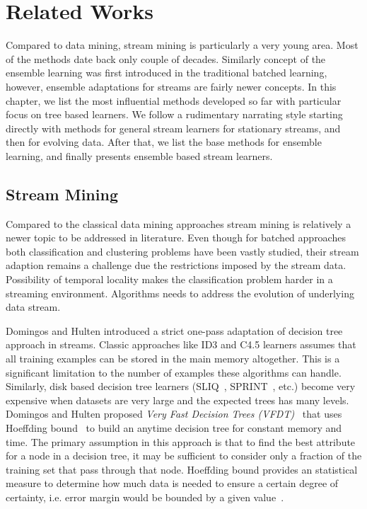 \section{Related Works}
\label{chp:relworks}
Compared to data mining, stream mining is particularly a very young area. Most of the methods date back only couple of decades. Similarly concept of the ensemble learning was first introduced in the traditional batched learning, however, ensemble adaptations for streams are fairly newer concepts. In this chapter, we list the most influential methods developed so far with particular focus on tree based learners. We follow a rudimentary narrating style starting directly with methods for general stream learners for stationary streams, and then for evolving data. After that, we list the base methods for ensemble learning, and finally presents ensemble based stream learners.

\subsection{Stream Mining}
Compared to the classical data mining approaches stream mining is relatively a newer topic to be addressed in literature. Even though for batched approaches both classification and clustering problems have been vastly studied, their stream adaption remains a challenge due the restrictions imposed by the stream data. Possibility of temporal locality makes the classification problem harder in a streaming environment. Algorithms needs to address the evolution of underlying data stream. 

Domingos and Hulten introduced a strict one-pass adaptation of decision tree~\cite{breiman84:dt,quinlan93:c45} approach in streams. Classic approaches like ID3 and C4.5 learners assumes that all training examples can be stored in the main memory altogether. This is a significant limitation to the number of examples these algorithms can handle. Similarly, disk based decision tree learners (SLIQ~\cite{mehta96:sliq}, SPRINT~\cite{shafer96:sprint}, etc.) become very expensive when datasets are very large and the expected trees has many levels. Domingos and Hulten proposed \textit{Very Fast Decision Trees (VFDT)}~\cite{domingos00:vfdt} that uses Hoeffding bound~\cite{hoeffding63:bound} to build an anytime decision tree for constant memory and time. The primary assumption in this approach is that to find the best attribute for a node in a decision tree, it may be sufficient to consider only a fraction of the training set that pass through that node. Hoeffding bound provides an statistical measure to determine how much data is needed to ensure a certain degree of certainty, i.e. error margin would be bounded by a given value~\cite{catlett91:thesis}.

